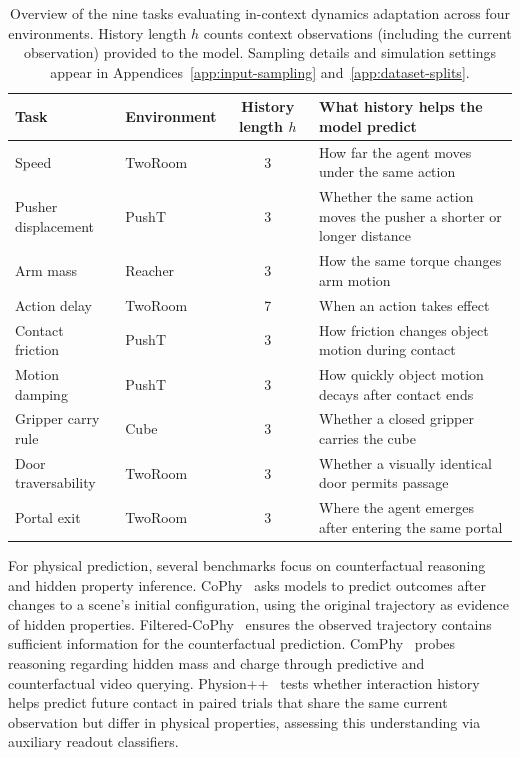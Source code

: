 \begin{table}[t]
\centering
\caption{Overview of the nine tasks evaluating in-context dynamics adaptation across four environments. History length $h$ counts context observations (including the current observation) provided to the model. Sampling details and simulation settings appear in Appendices~\ref{app:input-sampling} and~\ref{app:dataset-splits}.}
\label{tab:tasks}
\begin{tabularx}{\textwidth}{@{}llcX@{}}
\toprule
Task & Environment & History length $h$ & What history helps the model predict \\
\midrule
Speed & TwoRoom & 3 & How far the agent moves under the same action \\
Pusher displacement & PushT & 3 & Whether the same action moves the pusher a shorter or longer distance \\
Arm mass & Reacher & 3 & How the same torque changes arm motion \\
Action delay & TwoRoom & 7 & When an action takes effect \\
Contact friction & PushT & 3 & How friction changes object motion during contact \\
Motion damping & PushT & 3 & How quickly object motion decays after contact ends \\
Gripper carry rule & Cube & 3 & Whether a closed gripper carries the cube \\
Door traversability & TwoRoom & 3 & Whether a visually identical door permits passage \\
Portal exit & TwoRoom & 3 & Where the agent emerges after entering the same portal \\
\bottomrule
\end{tabularx}
\end{table}

For physical prediction, several benchmarks focus on counterfactual reasoning and hidden property inference.
CoPhy~\cite{baradel2020cophy} asks models to predict outcomes after changes to a scene's initial configuration, using the original trajectory as evidence of hidden properties.
Filtered-CoPhy~\cite{janny2022filteredcophy} ensures the observed trajectory contains sufficient information for the counterfactual prediction.
ComPhy~\cite{chen2022comphy} probes reasoning regarding hidden mass and charge through predictive and counterfactual video querying.
Physion++~\cite{tung2023physionpp} tests whether interaction history helps predict future contact in paired trials that share the same current observation but differ in physical properties, assessing this understanding via auxiliary readout classifiers.

